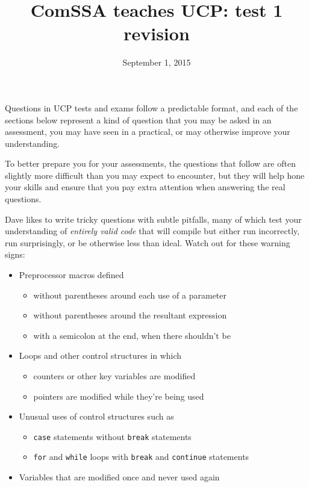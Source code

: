 \documentclass[a4paper,12pt]{article}
\title{ComSSA teaches UCP: test 1 revision}
\date{September 1, 2015}
\begin{document}
\maketitle

Questions in UCP tests and exams follow a predictable format, and each
of the sections below represent a kind of question that you may be
asked in an assessment, you may have seen in a practical, or may
otherwise improve your understanding.

To better prepare you for your assessments, the questions that follow
are often slightly more difficult than you may expect to encounter, but
they will help hone your skills and ensure that you pay extra attention
when answering the real questions.

Dave likes to write tricky questions with subtle pitfalls, many of
which test your understanding of \emph{entirely valid code} that will
compile but either run incorrectly, run surprisingly, or be otherwise
less than ideal. Watch out for these warning signs:

\begin{itemize}
	\item Preprocessor macros defined
	\begin{itemize}
		\item without parentheses around each use of a parameter
		\item without parentheses around the resultant expression
		\item with a semicolon at the end, when there shouldn't be
	\end{itemize}
	\item Loops and other control structures in which
	\begin{itemize}
		\item counters or other key variables are modified
		\item pointers are modified while they're being used
	\end{itemize}
	\item Unusual uses of control structures such as
	\begin{itemize}
		\item \texttt{case} statements without
		      \texttt{break} statements
		\item \texttt{for} and \texttt{while} loops with
		      \texttt{break} and \texttt{continue} statements
	\end{itemize}
	\item Variables that are modified once and never used again
\end{itemize}
\end{document}
